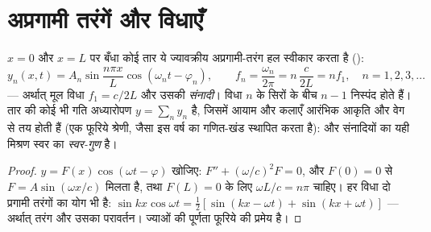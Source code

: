 \section{अप्रगामी तरंगें और विधाएँ}

\begin{proposition}[दोनों सिरों पर बँधे तार की विधाएँ]\label{prop:b2:waves-on-strings:modes}
$x = 0$ और $x = L$ पर बँधा कोई तार ये ज्यावक्रीय अप्रगामी-तरंग हल
स्वीकार करता है (\emph{}):
\[
y_n(x, t) = A_n\sin\frac{n\pi x}{L}\cos(\omega_nt - \varphi_n) , \qquad
f_n = \frac{\omega_n}{2\pi} = n\,\frac{c}{2L} = n f_1 , \quad n = 1, 2, 3, \dots
\]
--- अर्थात् मूल विधा $f_1 = c/2L$ और उसकी \emph{संनादी}। विधा $n$ के
सिरों के बीच $n - 1$ निस्पंद होते हैं। तार की कोई भी गति
अध्यारोपण $y = \sum_ny_n$ है, जिसमें आयाम और कलाएँ आरंभिक आकृति और वेग
से तय होती हैं (एक फूरिये श्रेणी, जैसा इस वर्ष का गणित-खंड
स्थापित करता है): और संनादियों का यही मिश्रण स्वर का
\emph{स्वर-गुण} है।
\end{proposition}

\begin{proof}
$y = F(x)\cos(\omega t - \varphi)$ खोजिए: $F'' + (\omega/c)^2F = 0$, और $F(0) = 0$ से
$F = A\sin(\omega x/c)$ मिलता है, तथा $F(L) = 0$ के लिए $\omega L/c = n\pi$ चाहिए। हर विधा
दो प्रगामी तरंगों का योग भी है: $\sin kx\cos\omega t = \tfrac12[\sin(kx -
\omega t) + \sin(kx + \omega t)]$ --- अर्थात् तरंग और उसका परावर्तन।
ज्याओं की पूर्णता फूरिये की प्रमेय है।
\end{proof}

